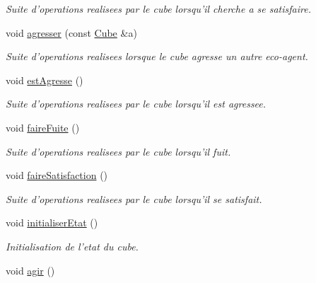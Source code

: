 \begin{CompactItemize}
\begin{CompactList}\small\item\em Suite d'operations realisees par le cube lorsqu'il cherche a se satisfaire. \item\end{CompactList}\item 
void \hyperlink{classCube_2b9c63b545c13c95b9a7f44c3c5147ad}{agresser} (const \hyperlink{classCube}{Cube} \&a)
\begin{CompactList}\small\item\em Suite d'operations realisees lorsque le cube agresse un autre eco-agent. \item\end{CompactList}\item 
\hypertarget{classCube_a9af44bff02fb06ac5be83f4c041fe57}{
void \hyperlink{classCube_a9af44bff02fb06ac5be83f4c041fe57}{estAgresse} ()}
\label{classCube_a9af44bff02fb06ac5be83f4c041fe57}

\begin{CompactList}\small\item\em Suite d'operations realisees par le cube lorsqu'il est agressee. \item\end{CompactList}\item 
\hypertarget{classCube_ce1011f5a33ce211d5ca44e029f59224}{
void \hyperlink{classCube_ce1011f5a33ce211d5ca44e029f59224}{faireFuite} ()}
\label{classCube_ce1011f5a33ce211d5ca44e029f59224}

\begin{CompactList}\small\item\em Suite d'operations realisees par le cube lorsqu'il fuit. \item\end{CompactList}\item 
\hypertarget{classCube_1fec2199edab8e6cfdb3685256d2cdec}{
void \hyperlink{classCube_1fec2199edab8e6cfdb3685256d2cdec}{faireSatisfaction} ()}
\label{classCube_1fec2199edab8e6cfdb3685256d2cdec}

\begin{CompactList}\small\item\em Suite d'operations realisees par le cube lorsqu'il se satisfait. \item\end{CompactList}\item 
void \hyperlink{classCube_51dbc3cc9578d3cf5f9e56cab24aff1f}{initialiserEtat} ()
\begin{CompactList}\small\item\em Initialisation de l'etat du cube. \item\end{CompactList}\item 
\hypertarget{classCube_9289a4d72b849b7f868b189f531daa62}{
void \hyperlink{classCube_9289a4d72b849b7f868b189f531daa62}{agir} ()}
\label{classCube_9289a4d72b849b7f868b189f531daa62}


\end{CompactItemize}
